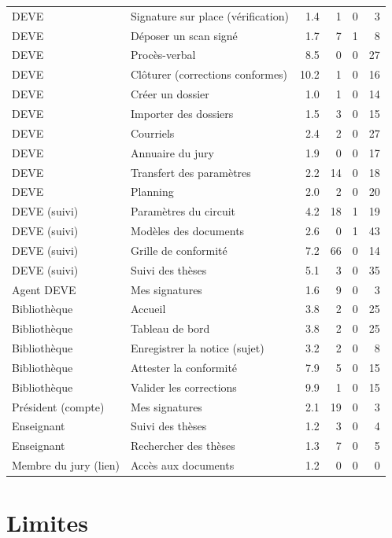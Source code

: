 \documentclass[11pt,a4paper]{article}
\begin{document}
\begin{small}
\begin{longtable}{@{}p{3.1cm} p{6.4cm} r r r r@{}}
DEVE & Signature sur place (vérification) & 1.4 & 1 & 0 & 3 \\
DEVE & Déposer un scan signé & 1.7 & 7 & 1 & 8 \\
DEVE & Procès-verbal & 8.5 & 0 & 0 & 27 \\
DEVE & Clôturer (corrections conformes) & 10.2 & 1 & 0 & 16 \\
DEVE & Créer un dossier & 1.0 & 1 & 0 & 14 \\
DEVE & Importer des dossiers & 1.5 & 3 & 0 & 15 \\
DEVE & Courriels & 2.4 & 2 & 0 & 27 \\
DEVE & Annuaire du jury & 1.9 & 0 & 0 & 17 \\
DEVE & Transfert des paramètres & 2.2 & 14 & 0 & 18 \\
DEVE & Planning & 2.0 & 2 & 0 & 20 \\
DEVE (suivi) & Paramètres du circuit & 4.2 & 18 & 1 & 19 \\
DEVE (suivi) & Modèles des documents & 2.6 & 0 & 1 & 43 \\
DEVE (suivi) & Grille de conformité & 7.2 & 66 & 0 & 14 \\
DEVE (suivi) & Suivi des thèses & 5.1 & 3 & 0 & 35 \\
Agent DEVE & Mes signatures & 1.6 & 9 & 0 & 3 \\
Bibliothèque & Accueil & 3.8 & 2 & 0 & 25 \\
Bibliothèque & Tableau de bord & 3.8 & 2 & 0 & 25 \\
Bibliothèque & Enregistrer la notice (sujet) & 3.2 & 2 & 0 & 8 \\
Bibliothèque & Attester la conformité & 7.9 & 5 & 0 & 15 \\
Bibliothèque & Valider les corrections & 9.9 & 1 & 0 & 15 \\
Président (compte) & Mes signatures & 2.1 & 19 & 0 & 3 \\
Enseignant & Suivi des thèses & 1.2 & 3 & 0 & 4 \\
Enseignant & Rechercher des thèses & 1.3 & 7 & 0 & 5 \\
Membre du jury (lien) & Accès aux documents & 1.2 & 0 & 0 & 0 \\
\bottomrule
\end{longtable}
\end{small}

\section{Limites}
\end{document}
